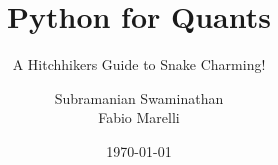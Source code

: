 \title{Python for Quants}
\subtitle{A Hitchhikers Guide to Snake Charming!}
\author{
  Subramanian Swaminathan \\
  Fabio Marelli
}
\vspace{4em}
\date{\today}


\begin{frame}
  \titlepage
\end{frame}


